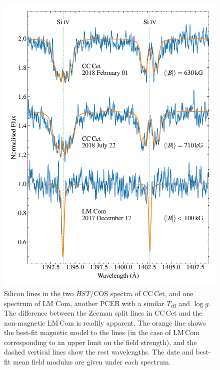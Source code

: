 \documentclass[fleqn,usenatbib]{mnras}
\begin{document}
\begin{figure}
    \centering
    \includegraphics[width=8 cm]{siiv_lines.pdf}
    \caption{Silicon  lines in the two \textit{HST}/COS spectra of CC\,Cet, and one spectrum of LM Com, another PCEB with a similar $T_{\mathrm{eff}}$ and $\log g$. The difference between the Zeeman split lines in CC\,Cet and the non-magnetic LM\,Com is readily apparent. The orange line shows the best-fit magnetic model to the lines (in the case of LM\,Com corresponding to an upper limit on the field strength), and the dashed vertical lines show the rest wavelengths. The date and best-fit mean field modulus are given under each spectrum.}
    \label{fig:siiv_lines}
\end{figure}
\end{document}

